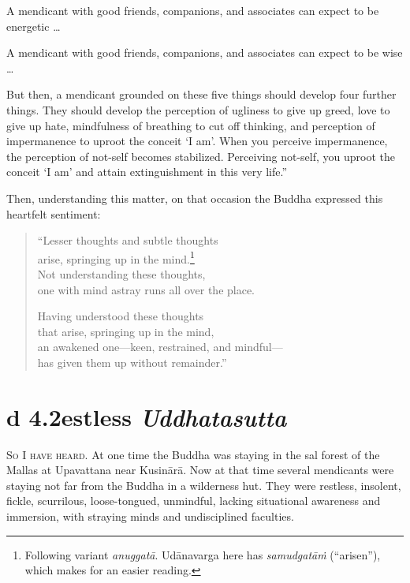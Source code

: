\documentclass[12pt,openany]{book}%
\newcommand*{\suttatitleacronym}[1]{\smaller[2]{#1}\vspace*{.3em}}
\newcommand*{\suttatitletranslation}[1]{\linebreak{#1}}
\newcommand*{\suttatitleroot}[1]{\linebreak\smaller[2]\itshape{#1}}
\newcommand*{\tocacronym}[1]{\hspace*{-3.3em}{#1}\quad}
\newcommand*{\toctranslation}[1]{#1}
\newcommand*{\tocroot}[1]{(\textit{#1})}
\newcommand*{\scevam}[1]{\textsc{#1}}
\begin{document}
A mendicant with good friends, companions, and associates can expect to be energetic … 

A mendicant with good friends, companions, and associates can expect to be wise … 

But then, a mendicant grounded on these five things should develop four further things. They should develop the perception of ugliness to give up greed, love to give up hate, mindfulness of breathing to cut off thinking, and perception of impermanence to uproot the conceit ‘I am’. When you perceive impermanence, the perception of not-self becomes stabilized. Perceiving not-self, you uproot the conceit ‘I am’ and attain extinguishment in this very life.” 

Then, understanding this matter, on that occasion the Buddha expressed this heartfelt sentiment: 

\begin{verse}%
“Lesser thoughts and subtle thoughts \\
arise, springing up in the mind.\footnote{Following variant \textit{\textsanskrit{anuggatā}}. \textsanskrit{Udānavarga} here has \textit{\textsanskrit{samudgatāṁ}} (“arisen”), which makes for an easier reading. } \\
Not understanding these thoughts, \\
one with mind astray runs all over the place. 

Having understood these thoughts \\
that arise, springing up in the mind, \\
an awakened one—keen, restrained, and mindful—\\
has given them up without remainder.” 

%
\end{verse}

%
\section*{{\suttatitleacronym Ud 4.2}{\suttatitletranslation Restless }{\suttatitleroot Uddhatasutta}}
\addcontentsline{toc}{section}{\tocacronym{Ud 4.2} \toctranslation{Restless } \tocroot{Uddhatasutta}}

\scevam{So I have heard. }At one time the Buddha was staying in the sal forest of the Mallas at Upavattana near \textsanskrit{Kusinārā}. Now at that time several mendicants were staying not far from the Buddha in a wilderness hut. They were restless, insolent, fickle, scurrilous, loose-tongued, unmindful, lacking situational awareness and immersion, with straying minds and undisciplined faculties. 
\end{document}
